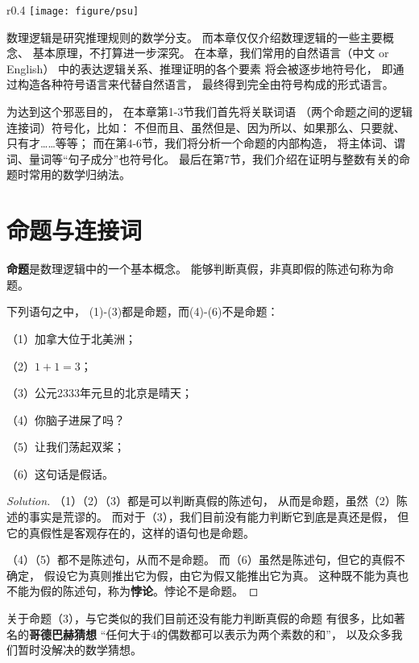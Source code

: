 
\begin{wrapfigure}{r}{0.4\textwidth}
\centering
\texttt{[image: figure/psu]}
\end{wrapfigure}数理逻辑是研究推理规则的数学分支。
而本章仅仅介绍数理逻辑的一些主要概念、
基本原理，不打算进一步深究。
在本章，我们常用的自然语言（中文 or English）
中的表达逻辑关系、推理证明的各个要素
将会被逐步地符号化，
即通过构造各种符号语言来代替自然语言，
最终得到完全由符号构成的形式语言。

为达到这个邪恶目的，
在本章第1-3节我们首先将关联词语
（两个命题之间的逻辑连接词）符号化，比如：
不但而且、虽然但是、因为所以、如果那么、只要就、只有才……等等；
而在第4-6节，我们将分析一个命题的内部构造，
将主体词、谓词、量词等“句子成分”也符号化。
最后在第7节，我们介绍在证明与整数有关的命题时常用的数学归纳法。


\section{命题与连接词}

\textbf{命题}是数理逻辑中的一个基本概念。
能够判断真假，非真即假的陈述句称为命题。

\begin{example}下列语句之中，
(1)-(3)都是命题，而(4)-(6)不是命题：

（1）加拿大位于北美洲；

（2）$1+1=3$；

（3）公元2333年元旦的北京是晴天；

（4）你脑子进屎了吗？

（5）让我们荡起双桨；

（6）这句话是假话。\label{examples of propositions}
\end{example}
\begin{proof}[Solution]
（1）（2）（3）都是可以判断真假的陈述句，
从而是命题，虽然（2）陈述的事实是荒谬的。
而对于（3），我们目前没有能力判断它到底是真还是假，
但它的真假性是客观存在的，这样的语句也是命题。

（4）（5）都不是陈述句，从而不是命题。
而（6）虽然是陈述句，但它的真假不确定，
假设它为真则推出它为假，由它为假又能推出它为真。
这种既不能为真也不能为假的陈述句，称为\textbf{悖论}。悖论不是命题。
\end{proof}

关于命题（3），与它类似的我们目前还没有能力判断真假的命题
有很多，比如著名的\textbf{哥德巴赫猜想}
“任何大于$4$的偶数都可以表示为两个素数的和”，
以及众多我们暂时没解决的数学猜想。\vsp

